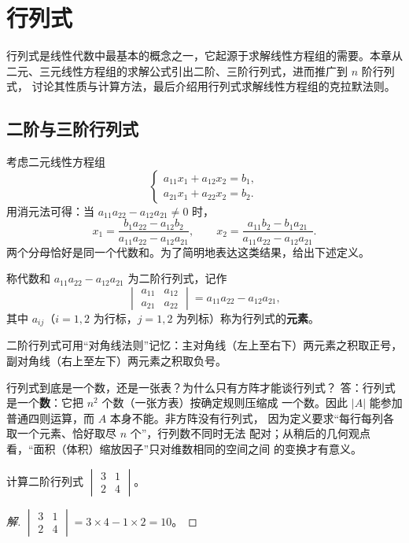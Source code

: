 \chapter{行列式}

行列式是线性代数中最基本的概念之一，它起源于求解线性方程组的需要。本章从
二元、三元线性方程组的求解公式引出二阶、三阶行列式，进而推广到 $n$ 阶行列式，
讨论其性质与计算方法，最后介绍用行列式求解线性方程组的克拉默法则。

\section{二阶与三阶行列式}

考虑二元线性方程组
\[
  \begin{cases}
    a_{11}x_1 + a_{12}x_2 = b_1, \\
    a_{21}x_1 + a_{22}x_2 = b_2.
  \end{cases}
\]
用消元法可得：当 $a_{11}a_{22}-a_{12}a_{21}\neq 0$ 时，
\[
  x_1=\frac{b_1a_{22}-a_{12}b_2}{a_{11}a_{22}-a_{12}a_{21}},
  \qquad
  x_2=\frac{a_{11}b_2-b_1a_{21}}{a_{11}a_{22}-a_{12}a_{21}} .
\]
两个分母恰好是同一个代数和。为了简明地表达这类结果，给出下述定义。

\begin{definition}\label{def:order2}
称代数和 $a_{11}a_{22}-a_{12}a_{21}$ 为二阶行列式，记作
\[
  \begin{vmatrix} a_{11} & a_{12} \\ a_{21} & a_{22} \end{vmatrix}
  = a_{11}a_{22}-a_{12}a_{21},
\]
其中 $a_{ij}$（$i=1,2$ 为行标，$j=1,2$ 为列标）称为行列式的\textbf{元素}。
\end{definition}

二阶行列式可用“对角线法则”记忆：主对角线（左上至右下）两元素之积取正号，
副对角线（右上至左下）两元素之积取负号。

\begin{qa}{行列式到底是一个数，还是一张表？为什么只有方阵才能谈行列式？}
答：行列式是一个\textbf{数}：它把 $n^2$ 个数（一张方表）按确定规则压缩成
一个数。因此 $|A|$ 能参加普通四则运算，而 $A$ 本身不能。非方阵没有行列式，
因为定义要求“每行每列各取一个元素、恰好取尽 $n$ 个”，行列数不同时无法
配对；从稍后的几何观点看，“面积（体积）缩放因子”只对维数相同的空间之间
的变换才有意义。
\end{qa}

\begin{example}
计算二阶行列式 $\begin{vmatrix} 3 & 1 \\ 2 & 4 \end{vmatrix}$。
\end{example}
\begin{proof}[解]
$\begin{vmatrix} 3 & 1 \\ 2 & 4 \end{vmatrix}=3\times 4-1\times 2=10$。
\end{proof}

